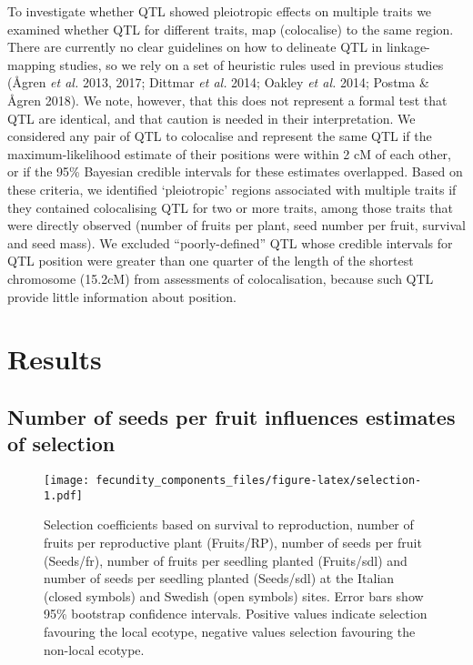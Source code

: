 \documentclass[12pt,]{article}
\begin{document}
To investigate whether QTL showed pleiotropic effects on multiple traits we examined whether QTL for different traits, map (colocalise) to the same region.
There are currently no clear guidelines on how to delineate QTL in linkage-mapping studies, so we rely on a set of heuristic rules used in previous studies (Ågren \emph{et al.} 2013, 2017; Dittmar \emph{et al.} 2014; Oakley \emph{et al.} 2014; Postma \& Ågren 2018).
We note, however, that this does not represent a formal test that QTL are identical, and that caution is needed in their interpretation.
We considered any pair of QTL to colocalise and represent the same QTL if the maximum-likelihood estimate of their positions were within 2 cM of each other, or if the 95\% Bayesian credible intervals for these estimates overlapped.
Based on these criteria, we identified `pleiotropic' regions associated with multiple traits if they contained colocalising QTL for two or more traits, among those traits that were directly observed (number of fruits per plant, seed number per fruit, survival and seed mass).
We excluded ``poorly-defined'' QTL whose credible intervals for QTL position were greater than one quarter of the length of the shortest chromosome (15.2cM) from assessments of colocalisation, because such QTL provide little information about position.

\hypertarget{results}{%
\section{Results}\label{results}}

\hypertarget{number-of-seeds-per-fruit-influences-estimates-of-selection}{%
\subsection{Number of seeds per fruit influences estimates of selection}\label{number-of-seeds-per-fruit-influences-estimates-of-selection}}

\begin{figure}
\centering
\texttt{[image: fecundity\_components\_files/figure-latex/selection-1.pdf]}
\caption{\label{fig:selection}Selection coefficients based on survival to reproduction, number of fruits per reproductive plant (Fruits/RP), number of seeds per fruit (Seeds/fr), number of fruits per seedling planted (Fruits/sdl) and number of seeds per seedling planted (Seeds/sdl) at the Italian (closed symbols) and Swedish (open symbols) sites. Error bars show 95\% bootstrap confidence intervals. Positive values indicate selection favouring the local ecotype, negative values selection favouring the non-local ecotype.}
\end{figure}
\end{document}

